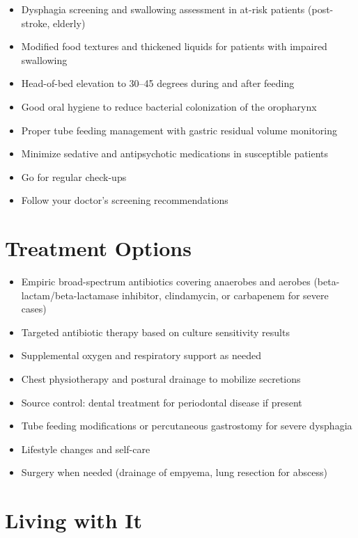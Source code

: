 \begin{itemize}[noitemsep]
  \item Dysphagia screening and swallowing assessment in at-risk patients (post-stroke, elderly)
  \item Modified food textures and thickened liquids for patients with impaired swallowing
  \item Head-of-bed elevation to 30--45 degrees during and after feeding
  \item Good oral hygiene to reduce bacterial colonization of the oropharynx
  \item Proper tube feeding management with gastric residual volume monitoring
  \item Minimize sedative and antipsychotic medications in susceptible patients
  \item Go for regular check-ups
  \item Follow your doctor's screening recommendations
\end{itemize}

\section{Treatment Options}

\begin{itemize}[noitemsep]
  \item Empiric broad-spectrum antibiotics covering anaerobes and aerobes (beta-lactam/beta-lactamase inhibitor, clindamycin, or carbapenem for severe cases)
  \item Targeted antibiotic therapy based on culture sensitivity results
  \item Supplemental oxygen and respiratory support as needed
  \item Chest physiotherapy and postural drainage to mobilize secretions
  \item Source control: dental treatment for periodontal disease if present
  \item Tube feeding modifications or percutaneous gastrostomy for severe dysphagia
  \item Lifestyle changes and self-care
  \item Surgery when needed (drainage of empyema, lung resection for abscess)
\end{itemize}

\section{Living with It}

